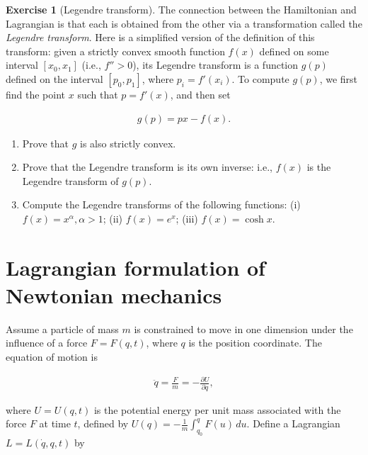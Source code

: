 \documentclass[11pt]{report}
\theoremstyle{plain}
\theoremstyle{definition}
\newtheorem{xexercise}[thm]{Exercise}
\begin{document}
\begin{xexercise}[Legendre transform]
The connection between the Hamiltonian and Lagrangian
is that each is obtained from the other via a
transformation called the \emph{Legendre transform}. Here
is a simplified version of the definition of this
transform: given a strictly convex smooth function
$f(x)$ defined on some interval $[x_0,x_1]$ (i.e.,
$f''>0$), its Legendre transform is a function $g(p)$
defined on the interval $[p_0,p_1]$, where
$p_i=f'(x_i)$. To compute $g(p)$, we first find the
point $x$ such that $p=f'(x)$, and then set

\begin{align*}
g(p) = px - f(x).
\end{align*}

\begin{enumerate}[label=\arabic*.]
\item Prove that $g$ is also strictly convex.

\item Prove that the Legendre transform is its own inverse:
i.e., $f(x)$ is the Legendre transform of $g(p)$.

\item Compute the Legendre transforms of the following
functions: (i) $f(x)=x^{\alpha}, \alpha>1$; (ii)
$f(x)=e^x$; (iii) $f(x)=\cosh x$.
\end{enumerate}

\end{xexercise}

\section{Lagrangian formulation of Newtonian mechanics}

Assume a particle of mass $m$ is constrained to move
in one dimension under the influence of a force
$F=F(q,t)$, where $q$ is the position coordinate. The
equation of motion is

\begin{equation*} \tag{7}\label{eq:newtonmotion}
\begin{split}
\ddot{q} = \frac{F}{m} = -\frac{\partial U}{\partial q},
\end{split}
\end{equation*}

\noindent where $U=U(q,t)$ is the potential energy per unit mass
associated with the force $F$ at time $t$, defined by
$U(q)=-\frac{1}{m}\int_{q_0}^ q F(u)\,du$. Define a
Lagrangian $L=L(\dot{q},q,t)$ by
\end{document}
